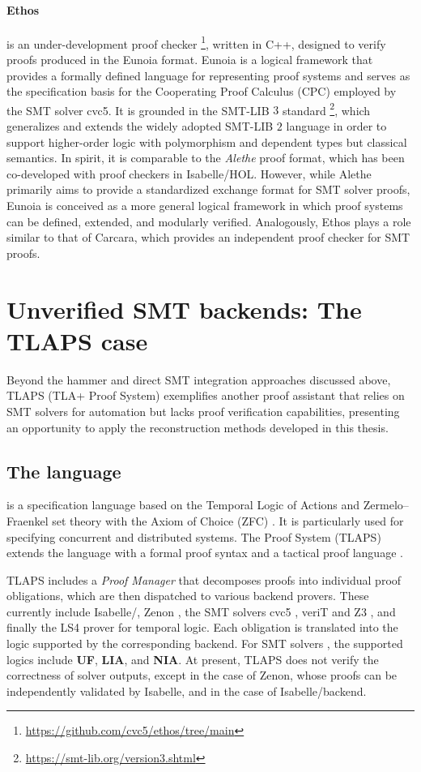 \paragraph{Ethos} is an under-development proof checker \footnote{\url{https://github.com/cvc5/ethos/tree/main}}, written in C++, designed to verify proofs produced in the Eunoia format.
Eunoia is a logical framework that provides a formally defined language for representing proof systems and serves as the specification basis for the Cooperating Proof Calculus (CPC) employed by the SMT solver cvc5.
It is grounded in the SMT-LIB $3$  standard \footnote{\url{https://smt-lib.org/version3.shtml}}, which generalizes and extends the widely adopted SMT-LIB $2$ language in order to support higher-order logic with polymorphism and dependent types but classical semantics.
In spirit, it is comparable to the \emph{Alethe} proof format, which has been co-developed with proof checkers in Isabelle/HOL. 
However, while Alethe primarily aims to provide a standardized exchange format for SMT solver proofs, Eunoia is conceived as a more general logical framework in which proof systems can be defined, extended, and modularly verified. 
Analogously, Ethos plays a role similar to that of Carcara, which provides an independent proof checker for SMT proofs.


\section{Unverified SMT backends: The TLAPS case}

Beyond the hammer and direct SMT integration approaches discussed above, TLAPS (TLA+ Proof System) exemplifies another proof assistant that relies on SMT solvers for automation but lacks proof verification capabilities, presenting an opportunity to apply the reconstruction methods developed in this thesis.

\subsection{The language}

\tlaplus is a specification language based on the Temporal Logic of Actions and Zermelo–Fraenkel set theory with the Axiom of Choice (ZFC) \cite{tlabook,tla-ref}.
It is particularly used for specifying concurrent and distributed systems.
The \tlaplus Proof System (TLAPS) extends the language with a formal proof syntax and a tactical proof language \cite{tla-proofs}.

TLAPS includes a \emph{Proof Manager} that decomposes proofs into individual proof obligations, which are then dispatched to various backend provers.
These currently include Isabelle/\tlaplus \cite{isabelle-hol-ref}, Zenon \cite{zenonmodulo},
the SMT solvers cvc5 \cite{cvc5}, veriT \cite{verit} and Z3 \cite{z3}, and finally the LS4 prover for temporal logic.
Each obligation is translated into the logic supported by the corresponding backend.
For SMT solvers \cite{new-encoding-tlaps}, the supported logics include \textbf{UF}, \textbf{LIA}, and \textbf{NIA}.
At present, TLAPS does not verify the correctness of solver outputs, except in the case of Zenon, whose proofs can be independently validated by Isabelle,
and in the case of Isabelle/\tlaplus backend.

